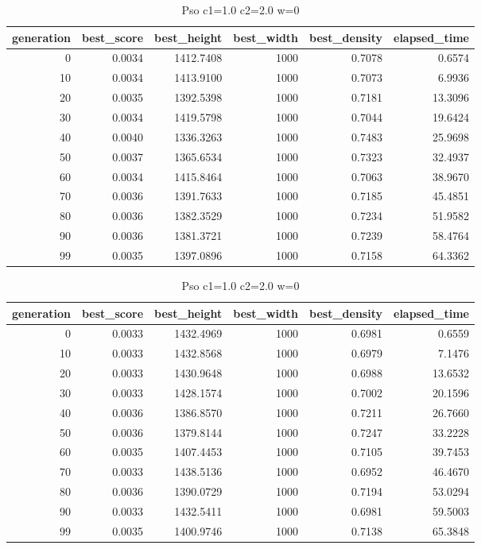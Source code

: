 \begin{table}[htbp]
    \centering
    \caption{Pso c1=1.0 c2=2.0 w=0}
    \label{tab:pso_c1_1_0_c2_2_0_w_0}
    \begin{tabular}{rrrrrr}
    \toprule
    generation & best_score & best_height & best_width & best_density & elapsed_time \\
    \midrule
    0 & 0.0034 & 1412.7408 & 1000 & 0.7078 & 0.6574 \\
    10 & 0.0034 & 1413.9100 & 1000 & 0.7073 & 6.9936 \\
    20 & 0.0035 & 1392.5398 & 1000 & 0.7181 & 13.3096 \\
    30 & 0.0034 & 1419.5798 & 1000 & 0.7044 & 19.6424 \\
    40 & 0.0040 & 1336.3263 & 1000 & 0.7483 & 25.9698 \\
    50 & 0.0037 & 1365.6534 & 1000 & 0.7323 & 32.4937 \\
    60 & 0.0034 & 1415.8464 & 1000 & 0.7063 & 38.9670 \\
    70 & 0.0036 & 1391.7633 & 1000 & 0.7185 & 45.4851 \\
    80 & 0.0036 & 1382.3529 & 1000 & 0.7234 & 51.9582 \\
    90 & 0.0036 & 1381.3721 & 1000 & 0.7239 & 58.4764 \\
    99 & 0.0035 & 1397.0896 & 1000 & 0.7158 & 64.3362 \\
    \bottomrule
    \end{tabular}
\end{table}


\begin{table}[htbp]
    \centering
    \caption{Pso c1=1.0 c2=2.0 w=0}
    \label{tab:pso_c1_1_0_c2_2_0_w_0}
    \begin{tabular}{rrrrrr}
    \toprule
    generation & best_score & best_height & best_width & best_density & elapsed_time \\
    \midrule
    0 & 0.0033 & 1432.4969 & 1000 & 0.6981 & 0.6559 \\
    10 & 0.0033 & 1432.8568 & 1000 & 0.6979 & 7.1476 \\
    20 & 0.0033 & 1430.9648 & 1000 & 0.6988 & 13.6532 \\
    30 & 0.0033 & 1428.1574 & 1000 & 0.7002 & 20.1596 \\
    40 & 0.0036 & 1386.8570 & 1000 & 0.7211 & 26.7660 \\
    50 & 0.0036 & 1379.8144 & 1000 & 0.7247 & 33.2228 \\
    60 & 0.0035 & 1407.4453 & 1000 & 0.7105 & 39.7453 \\
    70 & 0.0033 & 1438.5136 & 1000 & 0.6952 & 46.4670 \\
    80 & 0.0036 & 1390.0729 & 1000 & 0.7194 & 53.0294 \\
    90 & 0.0033 & 1432.5411 & 1000 & 0.6981 & 59.5003 \\
    99 & 0.0035 & 1400.9746 & 1000 & 0.7138 & 65.3848 \\
    \bottomrule
    \end{tabular}
\end{table}


